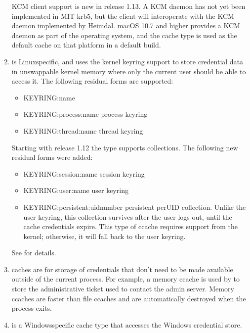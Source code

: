 \documentclass[letterpaper,10pt,english]{sphinxmanual}
\begin{document}
\begin{enumerate}
\sphinxAtStartPar
KCM client support is new in release 1.13.  A KCM daemon has not
yet been implemented in MIT krb5, but the client will interoperate
with the KCM daemon implemented by Heimdal.  macOS 10.7 and higher
provides a KCM daemon as part of the operating system, and the
 cache type is used as the default cache on that platform in
a default build.

\item {} 
\sphinxAtStartPar
{} is Linux\sphinxhyphen{}specific, and uses the kernel keyring support
to store credential data in unswappable kernel memory where only
the current user should be able to access it.  The following
residual forms are supported:
\begin{itemize}
\item {} 
\sphinxAtStartPar
KEYRING:name

\item {} 
\sphinxAtStartPar
KEYRING:process:name \sphinxhyphen{} process keyring

\item {} 
\sphinxAtStartPar
KEYRING:thread:name \sphinxhyphen{}  thread keyring

\end{itemize}

\sphinxAtStartPar
Starting with release 1.12 the  type supports collections.
The following new residual forms were added:
\begin{itemize}
\item {} 
\sphinxAtStartPar
KEYRING:session:name \sphinxhyphen{} session keyring

\item {} 
\sphinxAtStartPar
KEYRING:user:name \sphinxhyphen{} user keyring

\item {} 
\sphinxAtStartPar
KEYRING:persistent:uidnumber \sphinxhyphen{} persistent per\sphinxhyphen{}UID collection.
Unlike the user keyring, this collection survives after the user
logs out, until the cache credentials expire.  This type of
ccache requires support from the kernel; otherwise, it will fall
back to the user keyring.

\end{itemize}

\sphinxAtStartPar
See {\hyperref[\detokenize{basic/ccache_def:col-ccache}]{}} for details.

\item {} 
\sphinxAtStartPar
{} caches are for storage of credentials that don’t need to
be made available outside of the current process.  For example, a
memory ccache is used by  to store the
administrative ticket used to contact the admin server.  Memory
ccaches are faster than file ccaches and are automatically
destroyed when the process exits.

\item {} 
\sphinxAtStartPar
{} is a Windows\sphinxhyphen{}specific cache type that accesses the
Windows credential store.

\end{enumerate}
\end{document}
